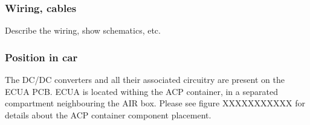 \subsubsection{Wiring, cables}
Describe the wiring, show schematics, etc.

\subsubsection{Position in car}
The DC/DC converters and all their associated circuitry are present on the ECUA PCB. ECUA is located withing the ACP container, in a separated compartment neighbouring the AIR box. Please see figure XXXXXXXXXXX for details about the ACP container component placement.